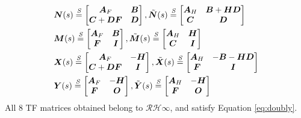 \begin{align*}
    &\bm{N}(s) \overset{\mathrm{\textit{S}}}{=} 
    \begin{bmatrix}
        \bm{A}_F & \bm{B}\\
        \bm{C} + \bm{DF}& \bm{D}
    \end{bmatrix},
    \Tilde{\bm{N}}(s) \overset{\mathrm{\textit{S}}}{=} 
    \begin{bmatrix}
        \bm{A}_H & \bm{B} + \bm{HD}\\
        \bm{C}& \bm{D}
    \end{bmatrix}\\
    &\bm{M}(s) \overset{\mathrm{\textit{S}}}{=} 
    \begin{bmatrix}
        \bm{A}_F & \bm{B}\\
        \bm{F}& \bm{I}
    \end{bmatrix},
    \Tilde{\bm{M}}(s) \overset{\mathrm{\textit{S}}}{=} 
    \begin{bmatrix}
        \bm{A}_H & \bm{H}\\
        \bm{C}& \bm{I}
    \end{bmatrix}\\
    &\bm{X}(s) \overset{\mathrm{\textit{S}}}{=} 
    \begin{bmatrix}
        \bm{A}_F & -\bm{H}\\
        \bm{C} + \bm{DF}& \bm{I}
    \end{bmatrix},
    \Tilde{\bm{X}}(s) \overset{\mathrm{\textit{S}}}{=} 
    \begin{bmatrix}
        \bm{A}_H & -\bm{B} - \bm{HD}\\
        \bm{F}& \bm{I}
    \end{bmatrix}\\
    &\bm{Y}(s) \overset{\mathrm{\textit{S}}}{=} 
    \begin{bmatrix}
        \bm{A}_F & -\bm{H}\\
        \bm{F}& \bm{O}
    \end{bmatrix},
    \Tilde{\bm{Y}}(s) \overset{\mathrm{\textit{S}}}{=} 
    \begin{bmatrix}
        \bm{A}_H & -\bm{H}\\
        \bm{F}& \bm{O}
    \end{bmatrix}
\end{align*}
All 8 TF matrices obtained belong to $\mathcal{RH}\infty$, and satisfy Equation \eqref{eq:doubly}.